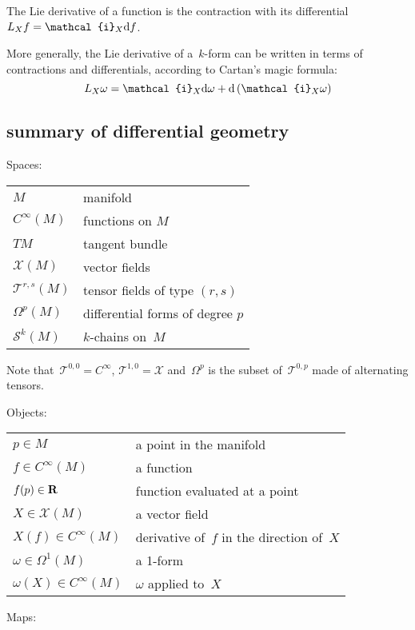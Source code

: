 The Lie derivative of a function is the contraction with its differential
\(L_Xf=\mathcal{i}_X\ud f\).

More generally, the Lie derivative of a~$k$-form can be written in terms of
contractions and differentials, according to Cartan's magic formula:
\[
	L_X\omega=\mathcal{i}_X\ud\omega+\ud\left(\mathcal{i}_X\omega\right)
\]

\clearpage
\subsection{summary of differential geometry}

Spaces:

\begin{tabular}{l|l}
	\hline
	$M$ & manifold \\
	$C^\infty(M)$ & functions on $M$ \\
	$TM$ & tangent bundle \\
	$\mathcal{X}(M)$ & vector fields \\
	$\mathcal{T}^{r,s}(M)$ & tensor fields of type $(r,s)$ \\
	$\Omega^p(M)$ & differential forms of degree $p$\\
	$\mathcal{S}^k(M)$ & $k$-chains on~$M$
\end{tabular}

Note that~$\mathcal{T}^{0,0}=C^\infty$,
$\mathcal{T}^{1,0}=\mathcal{X}$ and~$\Omega^p$ is the subset
of~$\mathcal{T}^{0,p}$ made of alternating tensors.


\bigskip

Objects:

\begin{tabular}{l|l}
	\hline
	$p\in M$ & a point in the manifold \\
	$f\in C^\infty(M)$ &a function \\
	$f(p)\in\mathbf{R}$ & function evaluated at a point \\
	$X\in \mathcal{X}(M)$ & a vector field \\
	$X(f)\in C^\infty(M)$ & derivative of~$f$ in the direction of~$X$ \\
	$\omega\in \Omega^1(M)$ & a 1-form \\
	$\omega(X)\in C^\infty(M)$ & $\omega$ applied to~$X$ \\
\end{tabular}


\bigskip

Maps:

